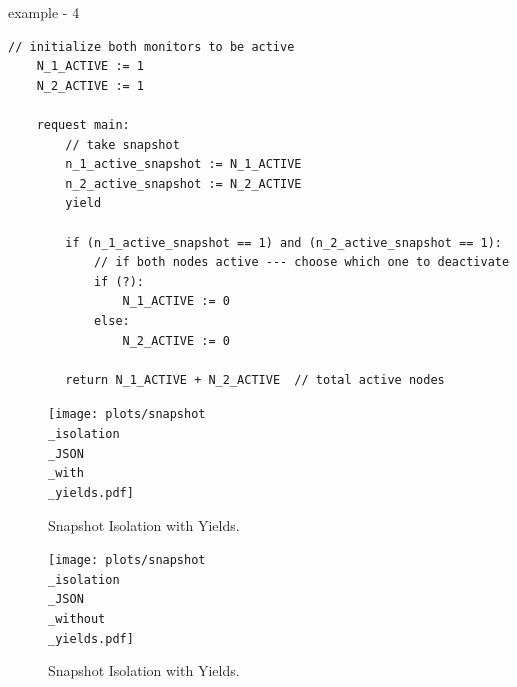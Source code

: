 \newpage

example - 4

\begin{minipage}[t]{1.0\textwidth}
\begin{lstlisting}[caption={Snapshot-based monitor deactivation (not serializable, as it can return a sume of 0 active monitors)}]
	// initialize both monitors to be active
    N_1_ACTIVE := 1
    N_2_ACTIVE := 1
	
    request main:
        // take snapshot
        n_1_active_snapshot := N_1_ACTIVE
        n_2_active_snapshot := N_2_ACTIVE
        yield
		
        if (n_1_active_snapshot == 1) and (n_2_active_snapshot == 1):
            // if both nodes active --- choose which one to deactivate 
            if (?): 
                N_1_ACTIVE := 0
            else:
                N_2_ACTIVE := 0

        return N_1_ACTIVE + N_2_ACTIVE  // total active nodes
\end{lstlisting}
\end{minipage}
	



\begin{figure}[h]
	\centering
\texttt{[image: plots/snapshot\\\_isolation\\\_JSON\\\_with\\\_yields.pdf]}
	\caption{Snapshot Isolation with Yields.}
	\label{fig:snapshotIsolationJsonWithYields}
\end{figure}




\begin{figure}[h]
	\centering
	\texttt{[image: plots/snapshot\\\_isolation\\\_JSON\\\_without\\\_yields.pdf]}
	\caption{Snapshot Isolation with Yields.}
	\label{fig:snapshotIsolationJsonWithoutYields}
\end{figure}




